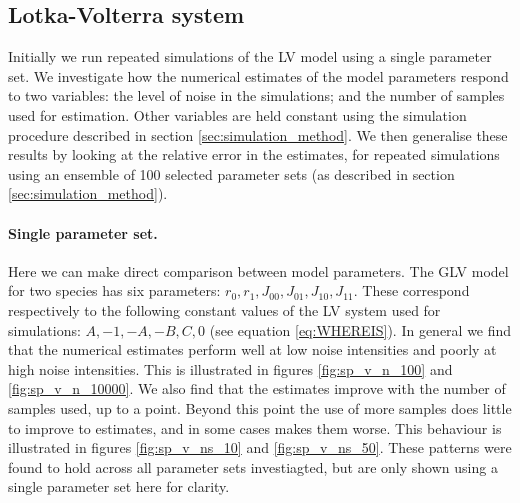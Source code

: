 \subsection{Lotka-Volterra system}
\label{sec:res_glv}

Initially we run repeated simulations of the LV model using a single parameter set. We investigate how the numerical estimates of the model parameters respond to two variables: the level of noise in the simulations; and the number of samples used for estimation. Other variables are held constant using the simulation procedure described in section \ref{sec:simulation_method}. We then generalise these results by looking at the relative error in the estimates, for repeated simulations using an ensemble of 100 selected parameter sets (as described in section \ref{sec:simulation_method}).

\paragraph*{Single parameter set.}

Here we can make direct comparison between model parameters. The GLV model for two species has six parameters: $r_0,r_1,J_{00},J_{01},J_{10},J_{11}$. These correspond respectively to the following constant values of the LV system used for simulations: $A,-1,-A,-B,C,0$ (see equation \ref{eq:WHEREIS}). In general we find that the numerical estimates perform well at low noise intensities and poorly at high noise intensities. This is illustrated in figures \ref{fig:sp_v_n_100} and \ref{fig:sp_v_n_10000}. We also find that the estimates improve with the number of samples used, up to a point. Beyond this point the use of more samples does little to improve to estimates, and in some cases makes them worse. This behaviour is illustrated in figures \ref{fig:sp_v_ns_10} and \ref{fig:sp_v_ns_50}. These patterns were found to hold across all parameter sets investiagted, but are only shown using a single parameter set here for clarity.

